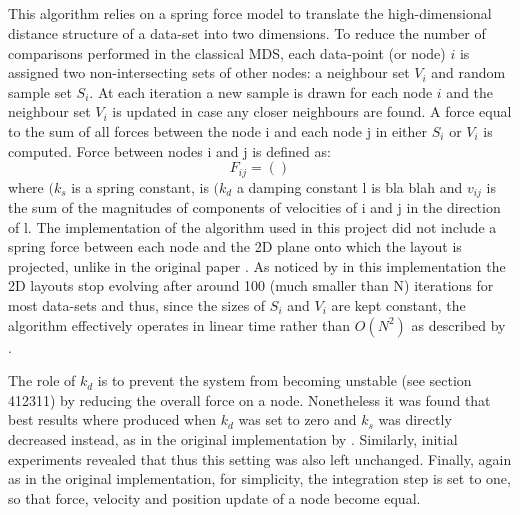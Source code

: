 \documentclass{l4proj}
\begin{document}
\subsection{\cite{Chalmers96}}
\label{chalmers96}

This algorithm relies on a spring force model to translate the high-dimensional distance structure of a data-set into two dimensions. To reduce the number of comparisons performed in the classical MDS, each data-point (or node) $i$ is assigned two non-intersecting sets of other nodes: a neighbour set $V_i$ and random sample set $S_i$. At each iteration a new sample is drawn for each node $i$ and the neighbour set $V_i$ is updated in case any closer neighbours are found. A force equal to the sum of all forces between the node i and each node j in either $S_i$ or $V_i$ is computed. Force between nodes i and j is defined as:
\begin{equation}
\label{tab:force}
        F_{ij} = ()
\end{equation}  
where $(k_{s}$ is a spring constant, is $(k_{d}$ a damping constant l is bla blah and $v_{ij}$ is the sum of the magnitudes of components of velocities of i and j in the direction of l. The implementation of the algorithm used in this project \citep{2019} did not include a spring force between each node and the 2D plane onto which the layout is projected, unlike in the original paper \citep{Chalmers96}. As noticed by \citet{2019} in this implementation the 2D layouts stop evolving after around 100 (much smaller than N) iterations for most data-sets and thus, since the sizes of $S_i$ and $V_i$ are kept constant, the algorithm effectively operates in linear time rather than $O(N^2)$ as described by \citet{Chalmers96}. 

The role of $k_{d}$ is to prevent the system from becoming unstable (see section 412311) by reducing the overall force on a node. Nonetheless it was found that best results where produced when $k_{d}$ was set to zero and $k_{s}$ was directly decreased instead, as in the original implementation by \citet{2019}. Similarly, initial experiments revealed that  thus this setting was also left unchanged. Finally,  again as in the original implementation, for simplicity, the integration step is set to one, so that force, velocity and position update of a node become equal. 

\subsection{\cite{hyrid}}
\end{document}
